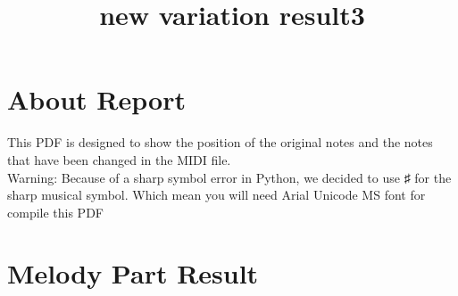 \documentclass{article}
\title{new variation result3}
\date{}
\begin{document}
\maketitle

\section*{About Report}
This PDF is designed to show the position of the original notes and the notes that have been changed in the MIDI file. \\
Warning: Because of a sharp symbol error in Python, we decided to use ♯ for the sharp musical symbol. Which mean you will need Arial Unicode MS font for compile this PDF 
\section*{Melody Part Result}
\end{document}
